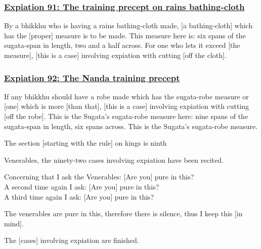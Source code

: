 \subsubsection*{\hyperref[pac91]{Expiation 91: The training precept on rains bathing-cloth}}
\label{exp91}
By a bhikkhu who is having a rains bathing-cloth made, [a bathing-cloth] which has the [proper] measure is to be made. This measure here is: six spans of the sugata-span in length, two and a half across. For one who lets it exceed [the measure], [this is a case] involving expiation with cutting [off the cloth].



\subsubsection*{\hyperref[pac92]{Expiation 92: The Nanda training precept}}
\label{exp92}
If any bhikkhu should have a robe made which has the sugata-robe measure or [one] which is more [than that], [this is a case] involving expiation with cutting [off the robe]. This is the Sugata's sugata-robe measure here: nine spans of the sugata-span in length, six spans across. This is the Sugata's sugata-robe measure.

\begin{center}
	The section [starting with the rule] on kings is ninth
\end{center}



\medskip

\begin{center}
	Venerables, the ninety-two cases involving expiation have been recited.

	\smallskip

	Concerning that I ask the Venerables: [Are you] pure in this?\\
	A second time again I ask: [Are you] pure in this?\\
	A third time again I ask: [Are you] pure in this?

	\smallskip

	The venerables are pure in this, therefore there is silence, thus I keep this [in mind].
\end{center}

\begin{outro}
	The [cases] involving expiation are finished.
\end{outro}

\clearpage

